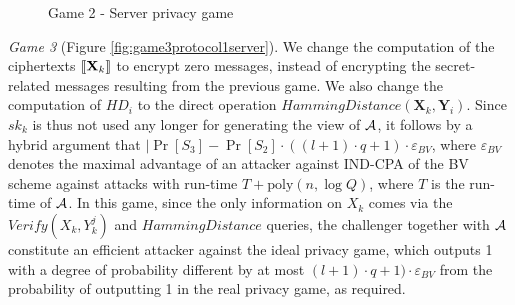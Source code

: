 \begin{figure}[htbp!] 
  \centering    
  \caption{Game 2 - Server privacy game}
  \label{fig:game2protocol1server}
\end{figure}
\textit{Game 3} (Figure \ref{fig:game3protocol1server}). We change the
computation of the ciphertexts $\left\llbracket\mathbf{X}_{k}\right\rrbracket$ to encrypt zero messages,
instead of encrypting the secret-related messages resulting from the previous
game. We also change the computation of $HD_{i}$ to the direct operation
$HammingDistance(\mathbf{X}_{k}, \mathbf{Y}_{i})$. Since $sk_k$ is thus not used
any longer for generating the view of $\mathcal{A}$, it follows by a hybrid
argument that
$|\Pr[S_3]-\Pr[S_2] \cdot ((l+1) \cdot q + 1) \cdot
\varepsilon_{BV}$, where $\varepsilon_{BV}$ denotes the maximal advantage of an
attacker against IND-CPA of the BV scheme against attacks with run-time
$T + \mathrm{poly}(n, \log Q)$, where $T$ is the run-time of $\mathcal{A}$.  In
this game, since the only information on $X_k$ comes via the
$Verify(X_k,Y_k^{j})$ and $HammingDistance$ queries, the challenger together
with $\mathcal{A}$ constitute an efficient attacker against the ideal privacy
game, which outputs 1 with a degree of probability different by at most
$(l+1) \cdot q + 1) \cdot \varepsilon_{BV}$ from the probability of outputting 1
in the real privacy game, as required.

